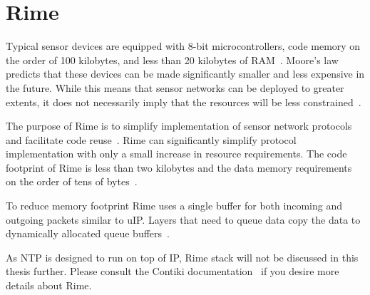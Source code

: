 
\section{Rime}\label{sec:contiki-rime}
Typical sensor devices are equipped with 8-bit microcontrollers,
code memory on the order of 100 kilobytes, and less than
20 kilobytes of RAM~\cite{paper-contiki}.
Moore's law predicts that these devices
can be made significantly smaller and less expensive
in the future. While this means that sensor networks can
be deployed to greater extents, it does not necessarily imply
that the resources will be less constrained~\cite{paper-contiki}.

The purpose of Rime is to simplify implementation of
sensor network protocols and facilitate code reuse~\cite{paper-rime}. 
Rime can significantly simplify protocol implementation
with only a small increase in resource requirements.
The code footprint of Rime is less than two kilobytes and the
data memory requirements on the order of tens of bytes~\cite{paper-rime}.

To reduce memory footprint Rime uses a single buffer for
both incoming and outgoing packets similar to uIP. Layers
that need to queue data copy the data to dynamically
allocated queue buffers~\cite{paper-rime}.


As NTP is designed to run on top of IP, Rime stack will not be discussed
in this thesis further.
Please consult the Contiki documentation~\cite{contiki-docs} if you desire
more details about Rime.
